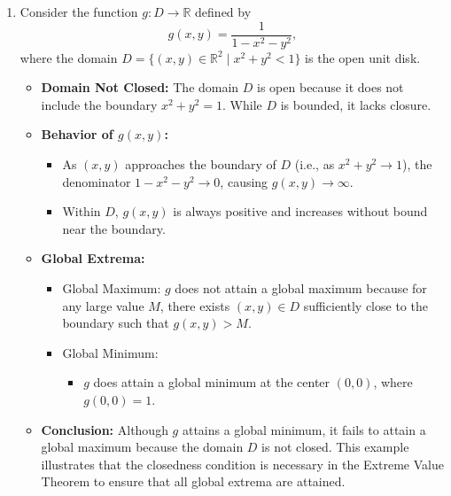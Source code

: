 \begin{example}
\begin{solution}
\begin{enumerate}
\begin{itemize}
    \item \textbf{Conclusion:} This example demonstrates that when the domain is unbounded, a continuous function may fail to attain global extrema. This highlights the necessity of the boundedness condition in the Extreme Value Theorem to ensure the existence of both a global maximum and a global minimum.
\end{itemize}

\item Consider the function \( g: D \to \mathbb{R} \) defined by
\[
g(x, y) = \frac{1}{1 - x^2 - y^2},
\]
where the domain \( D = \{ (x, y) \in \mathbb{R}^2 \mid x^2 + y^2 < 1 \} \) is the open unit disk.

\begin{itemize}
    \item \textbf{Domain Not Closed:} The domain \( D \) is open because it does not include the boundary \( x^2 + y^2 = 1 \). While \( D \) is bounded, it lacks closure.
    
    \item \textbf{Behavior of \( g(x, y) \):}
    \begin{itemize}
        \item As \( (x, y) \) approaches the boundary of \( D \) (i.e., as \( x^2 + y^2 \to 1 \)), the denominator \( 1 - x^2 - y^2 \to 0 \), causing \( g(x, y) \to \infty \).
        \item Within \( D \), \( g(x, y) \) is always positive and increases without bound near the boundary.
    \end{itemize}
    
    \item \textbf{Global Extrema:} 
    \begin{itemize}
        \item Global Maximum: \( g \) does not attain a global maximum because for any large value \( M \), there exists \( (x, y) \in D \) sufficiently close to the boundary such that \( g(x, y) > M \).
        \item Global Minimum:
        \begin{itemize}
            \item \( g \) does attain a global minimum at the center \( (0, 0) \), where \( g(0, 0) = 1 \).
            \end{itemize}
    \end{itemize}
    
    \item \textbf{Conclusion:} Although \( g \) attains a global minimum, it fails to attain a global maximum because the domain \( D \) is not closed. This example illustrates that the closedness condition is necessary in the Extreme Value Theorem to ensure that all global extrema are attained.
\end{itemize}
\end{enumerate}

\end{solution}
\end{example}


